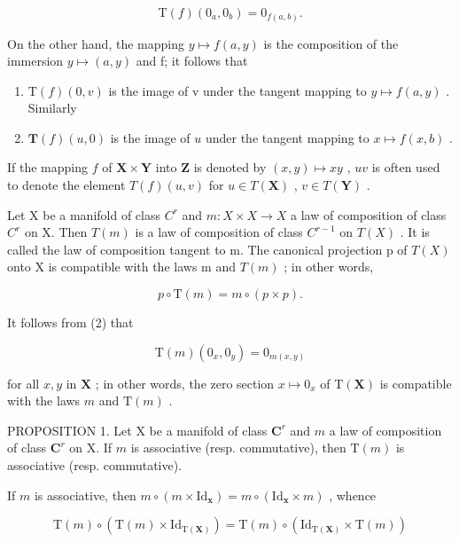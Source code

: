 \[
\mathrm{T} (f) \left(0 _ {a}, 0 _ {b}\right) = 0 _ {f (a, b)}.\tag{2}
\]

On the other hand, the mapping \(y \mapsto f(a, y)\) is the composition of the immersion \(y \mapsto (a, y)\) and f; it follows that

\begin{enumerate}
\def\labelenumi{(\arabic{enumi})}
\setcounter{enumi}{2}
\item
  \(\mathrm{T}(f)(0,v)\) is the image of v under the tangent mapping to \(y\mapsto f(a,y)\) . Similarly
\item
  \(\mathbf{T}(f)(u,0)\) is the image of \(u\) under the tangent mapping to \(x\mapsto f(x,b)\) .
\end{enumerate}

If the mapping \(f\) of \(\mathbf{X} \times \mathbf{Y}\) into \(\mathbf{Z}\) is denoted by \((x, y) \mapsto xy\) , \(uv\) is often used to denote the element \(T(f)(u, v)\) for \(u \in T(\mathbf{X})\) , \(v \in T(\mathbf{Y})\) .

Let X be a manifold of class \(C^{r}\) and \(m: X \times X \to X\) a law of composition of class \(C^{r}\) on X. Then \(T(m)\) is a law of composition of class \(C^{r-1}\) on \(T(X)\) . It is called the law of composition tangent to m. The canonical projection p of \(T(X)\) onto X is compatible with the laws m and \(T(m)\) ; in other words,

\[
p \circ \mathrm{T} (m) = m \circ (p \times p).\tag{5}
\]

It follows from (2) that

\[
\mathrm{T} (m) \left(0 _ {x}, 0 _ {y}\right) = 0 _ {m (x, y)}\tag{6}
\]

for all \(x, y\) in \(\mathbf{X}\) ; in other words, the zero section \(x \mapsto 0_x\) of \(\mathrm{T}(\mathbf{X})\) is compatible with the laws \(m\) and \(\mathrm{T}(m)\) .

PROPOSITION 1. Let X be a manifold of class \(\mathbf{C}^r\) and \(m\) a law of composition of class \(\mathbf{C}^r\) on X. If \(m\) is associative (resp. commutative), then \(\mathrm{T}(m)\) is associative (resp. commutative).

If \(m\) is associative, then \(m \circ (m \times \mathrm{Id}_{\mathbf{x}}) = m \circ (\mathrm{Id}_{\mathbf{x}} \times m)\) , whence

\[
\mathrm{T} (m) \circ (\mathrm{T} (m) \times \mathrm{Id} _ {\mathrm{T} (\mathbf {X})}) = \mathrm{T} (m) \circ (\mathrm{Id} _ {\mathrm{T} (\mathbf {X})} \times \mathrm{T} (m))
\]

